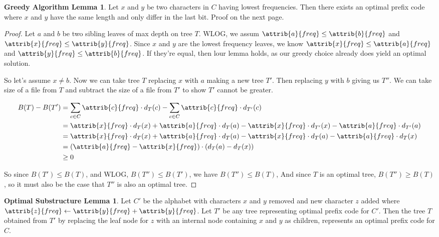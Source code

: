 \documentclass[11pt]{article}
\theoremstyle{definition}
\newtheorem*{greedy}{Greedy Algorithm Lemma}
\newtheorem*{substructure}{Optimal Substructure Lemma}
\begin{document}
\begin{greedy}
  Let \(x\) and \(y\) be two characters in \(C\) having lowest frequencies. Then there exists an 
  optimal prefix code where \(x\) and \(y\) have the same length and only differ in the last bit. 
  Proof on the next page.
\end{greedy}
\newpage 
\begin{proof}
  Let \(a\) and \(b\) be two sibling leaves of max depth on tree \(T\).  WLOG, we assum 
  \(\attrib{a}{freq} \leq \attrib{b}{freq}\) and \(\attrib{x}{freq} \leq \attrib{y}{freq}\).
  Since \(x\) and \(y\) are the lowest frequency leaves, we know 
  \(\attrib{x}{freq} \leq \attrib{a}{freq}\) and \(\attrib{y}{freq} \leq \attrib{b}{freq}\).
  If they're equal, then lour lemma holds, as our greedy choice already does yield an optimal 
  solution.

  So let's assume \(x \neq b\).  Now we can take tree \(T\) replacing \(x\) with \(a\) making 
  a new tree \(T'\).  Then replacing \(y\) with \(b\) giving us \(T''\).  We can take size of 
  a file from \(T\) and subtract the size of a file from \(T'\) to show \(T'\) cannot be greater. 

  \begin{align*}
    && B(T)-B(T') &= \sum_{c \in C} \attrib{c}{freq} \cdot d_T(c) - 
    \sum_{c \in C} \attrib{c}{freq} \cdot d_{T'}(c) && \\
    && &= \attrib{x}{freq} \cdot d_T(x) + \attrib{a}{freq} \cdot d_T(a)
         -\attrib{x}{freq} \cdot d_{T'}(x) - \attrib{a}{freq} \cdot d_{T'}(a) && \\ 
    && &= \attrib{x}{freq} \cdot d_T(x) + \attrib{a}{freq} \cdot d_T(a)
         -\attrib{x}{freq} \cdot d_T(a) - \attrib{a}{freq} \cdot d_T(x) && \\ 
    && &= (\attrib{a}{freq} - \attrib{x}{freq}) \cdot (d_T(a) - d_T(x)) && \\
    && &\geq 0
  \end{align*}

  So since \(B(T') \leq B(T)\), and WLOG, \(B(T'') \leq B(T')\), we have \(B(T'') \leq B(T)\), 
  And since \(T\) is an optimal tree, \(B(T'') \geq B(T)\), so it must also be the case that 
  \(T''\) is also an optimal tree.
\end{proof}

\begin{substructure}
  Let \(C'\) be the alphabet with characters \(x\) and \(y\) removed and new character \(z\)
  added where \(\attrib{z}{freq} \gets \attrib{y}{freq} + \attrib{y}{freq}\). Let \(T'\) be any 
  tree representing optimal prefix code for \(C'\). Then the tree \(T\) obtained from \(T'\) by 
  replacing the leaf node for \(z\) with an internal node containing \(x\) and \(y\) as children, 
  represents an optimal prefix code for \(C\).
\end{substructure}
\end{document}
